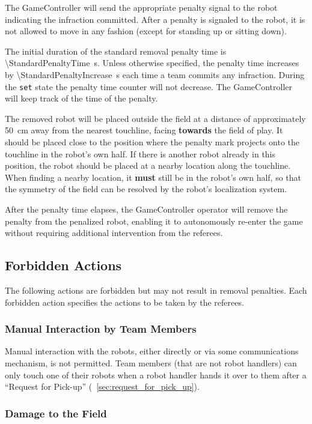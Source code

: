 The GameController will send the appropriate penalty signal to the robot indicating the infraction committed. After a penalty is signaled to the robot, it is not allowed to move in any fashion (except for standing up or sitting down).

The initial duration of the standard removal penalty time is \qty{\StandardPenaltyTime}{\second}. Unless otherwise specified, the penalty time increases by \qty{\StandardPenaltyIncrease}{\second} each time a team commits any infraction. During the \texttt{set} state the penalty time counter will not decrease. The GameController will keep track of the time of the penalty.

The removed robot will be placed outside the field at a distance of approximately \qty{50}{\centi\metre} away from the nearest touchline, facing \textbf{towards} the field of play. It should be placed close to the position where the penalty mark projects onto the touchline in the robot's own half. If there is another robot already in this position, the robot should be placed at a nearby location along the touchline. When finding a nearby location, it \textbf{must} still be in the robot's own half, so that the symmetry of the field can be resolved by the robot's localization system.

After the penalty time elapses, the GameController operator will remove the penalty from the penalized robot, enabling it to autonomously re-enter the game without requiring additional intervention from the referees.

\subsection{Forbidden Actions}

The following actions are forbidden but may not result in removal penalties. Each forbidden action specifies the actions to be taken by the referees.

\subsubsection{Manual Interaction by Team Members}

Manual interaction with the robots, either directly or via some communications mechanism, is not permitted. Team members (that are not robot handlers) can only touch one of their robots when a robot handler hands it over to them after a ``Request for Pick-up'' (\cf~\cref{sec:request_for_pick_up}).

\subsubsection{Damage to the Field}
\label{sec:damage}

